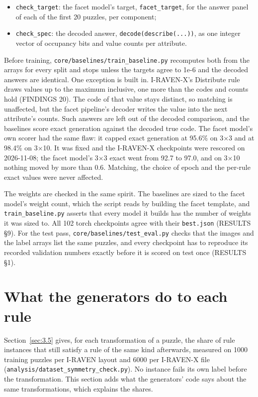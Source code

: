 \begin{itemize}
\item \texttt{check\_target}: the facet model's target, \texttt{facet\_target}, for the answer panel of each of the first 20 puzzles, per component;
\item \texttt{check\_spec}: the decoded answer, \texttt{decode(describe(...))}, as one integer vector of occupancy bits and value counts per attribute.
\end{itemize}

Before training, \texttt{core/baselines/train\_baseline.py} recomputes both from the arrays for every split and stops unless the targets agree to 1e-6 and the decoded answers are identical. One exception is built in. I-RAVEN-X's Distribute rule draws values up to the maximum inclusive, one more than the codes and counts hold (FINDINGS 20). The code of that value stays distinct, so matching is unaffected, but the facet pipeline's decoder writes the value into the next attribute's counts. Such answers are left out of the decoded comparison, and the baselines score exact generation against the decoded true code. The facet model's own scorer had the same flaw: it capped exact generation at 95.6\% on 3×3 and at 98.4\% on 3×10. It was fixed and the I-RAVEN-X checkpoints were rescored on 2026-11-08; the facet model's 3×3 exact went from 92.7 to 97.0, and on 3×10 nothing moved by more than 0.6. Matching, the choice of epoch and the per-rule exact values were never affected.

The weights are checked in the same spirit. The baselines are sized to the facet model's weight count, which the script reads by building the facet template, and \texttt{train\_baseline.py} asserts that every model it builds has the number of weights it was sized to. All 102 torch checkpoints agree with their \texttt{best.json} (RESULTS \S{}9). For the test pass, \texttt{core/baselines/test\_eval.py} checks that the images and the label arrays list the same puzzles, and every checkpoint has to reproduce its recorded validation numbers exactly before it is scored on test once (RESULTS \S{}1).

\section{What the generators do to each rule}\label{sec:B.2}

Section~\ref{sec:3.5} gives, for each transformation of a puzzle, the share of rule instances that still satisfy a rule of the same kind afterwards, measured on 1000 training puzzles per I-RAVEN layout and 6000 per I-RAVEN-X file (\texttt{analysis/dataset\_symmetry\_check.py}). No instance fails its own label before the transformation. This section adds what the generators' code says about the same transformations, which explains the shares.

